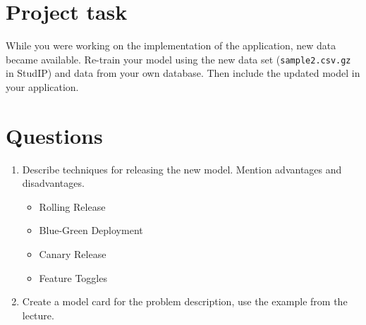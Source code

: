 

\newcommand{\dozenten}{Prof.~Dr.~Steffen Herbold}
\newcommand{\vorlesung}{Principles of AI Engineering}
\newcommand{\docauthor}{Lukas Schulte}
\newcommand{\semester}{}
\newcommand{\blattnummer}{11}
\newcommand{\bistermin}{}



\section*{Project task}

While you were working on the implementation of the application, new data became available. Re-train your model using the new data set (\texttt{sample2.csv.gz} in StudIP) and data from your own database. Then include the updated model in your application.

\section*{Questions}

\begin{enumerate}
    \item
          Describe techniques for releasing the new model. Mention advantages and disadvantages.
          \begin{itemize}
              \item Rolling Release
              \item Blue-Green Deployment
              \item Canary Release
              \item Feature Toggles
          \end{itemize}
    \item
          Create a model card for the problem description, use the example from the lecture.
\end{enumerate}


